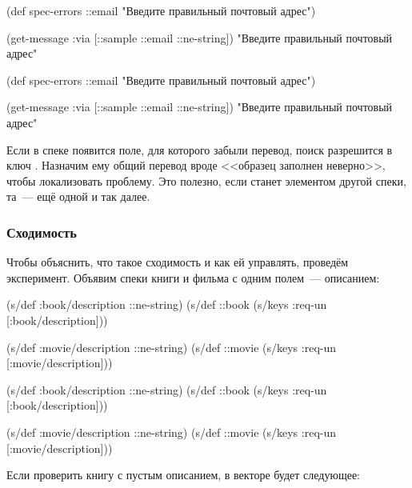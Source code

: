 \ifnarrow

\begin{clojure}
(def spec-errors
  {::email
   "Введите правильный почтовый адрес"})

(get-message
  {:via [::sample ::email ::ne-string]})
"Введите правильный почтовый адрес"
\end{clojure}

\else

\begin{clojure}
(def spec-errors
  {::email "Введите правильный почтовый адрес"})

(get-message {:via [::sample ::email ::ne-string]})
"Введите правильный почтовый адрес"
\end{clojure}

\fi

Если в спеке  появится поле, для которого забыли перевод, поиск
разрешится в ключ . Назначим ему общий перевод вроде <<образец
заполнен неверно>>, чтобы локализовать проблему. Это полезно, если
 станет элементом другой спеки, та~--- ещё одной и так далее.

\subsubsection*{Сходимость}

Чтобы объяснить, что такое сходимость и как ей управлять, проведём
эксперимент. Объявим спеки книги и фильма с одним полем~--- описанием:

\ifnarrow


\begin{clojure}
(s/def :book/description ::ne-string)
(s/def ::book
  (s/keys :req-un [:book/description]))

(s/def :movie/description ::ne-string)
(s/def ::movie
  (s/keys :req-un [:movie/description]))
\end{clojure}


\else


\begin{clojure}
(s/def :book/description ::ne-string)
(s/def ::book (s/keys :req-un [:book/description]))

(s/def :movie/description ::ne-string)
(s/def ::movie (s/keys :req-un [:movie/description]))
\end{clojure}


\fi

Если проверить книгу с пустым описанием, в векторе  будет следующее:

